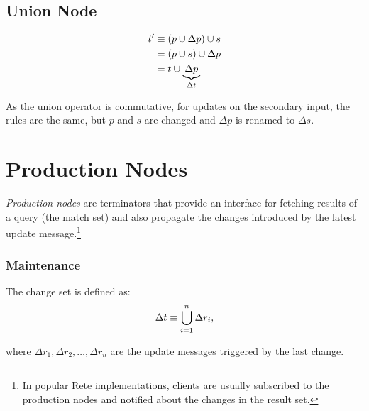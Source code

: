 \subsection{Union Node}

\begin{align*}
	t' & \equiv (p \cup \Delta p) \cup s \\
	   & = (p \cup s) \cup \Delta p \\
	   & = t \cup \underbrace{\Delta p}_{\Delta t}
\end{align*}

As the union operator is commutative, for updates on the secondary input, the rules are the same, but $p$ and $s$ are changed and $\Delta p$ is renamed to $\Delta s$.

\section{Production Nodes}
\label{sec:production-node}

\emph{Production nodes} are terminators that provide an interface for fetching results of a query (the match set) and also propagate the changes introduced by the latest update message.\footnote{In popular Rete implementations, clients are usually subscribed to the production nodes and notified about the changes in the result set.}

\subsubsection{Maintenance}

The change set is defined as:
$$\Delta t \equiv \bigcup_{i=1}^{n} \Delta r_i,$$

where $\Delta r_1, \Delta r_2, \ldots, \Delta r_n$ are the update messages triggered by the last change.
